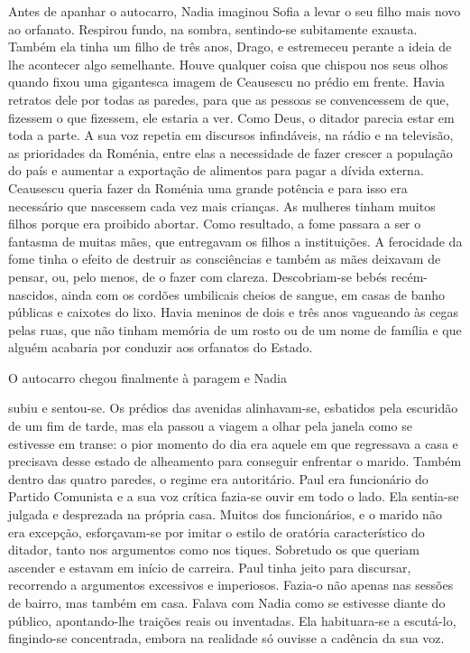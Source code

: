 Antes de apanhar o autocarro, Nadia imaginou Sofia a levar o seu filho
mais novo ao orfanato. Respirou fundo, na sombra, sentindo-se
subitamente exausta. Também ela tinha um filho de três anos, Drago, e
estremeceu perante a ideia de lhe acontecer algo semelhante. Houve
qualquer coisa que chispou nos seus olhos quando fixou uma gigantesca
imagem de Ceausescu no prédio em frente. Havia retratos dele por todas
as paredes, para que as pessoas se convencessem de que, fizessem o que
fizessem, ele estaria
a ver. Como Deus, o ditador parecia estar em toda a parte. A sua voz
repetia em discursos infindáveis, na rádio e na televisão, as
prioridades da Roménia, entre elas a necessidade de fazer crescer a
população do país e aumentar a exportação de alimentos para pagar a
dívida externa. Ceausescu queria fazer da Roménia uma grande potência e
para isso era necessário que nascessem cada vez mais crianças. As
mulheres tinham muitos filhos porque era proibido abortar. Como
resultado, a fome passara a ser o fantasma de muitas mães, que
entregavam os filhos a instituições. A ferocidade da fome tinha o
efeito de destruir as consciências e também as mães deixavam de pensar,
ou, pelo menos, de o fazer com clareza. Descobriam-se bebés
recém-nascidos, ainda com os cordões umbilicais cheios de sangue, em
casas de banho públicas e caixotes do lixo. Havia meninos de dois e três
anos vagueando às cegas pelas ruas, que não tinham memória de um rosto
ou de um nome de família e que alguém acabaria por conduzir aos
orfanatos do Estado.

O autocarro chegou finalmente à paragem e Nadia

subiu e sentou-se. Os prédios das avenidas alinhavam-se, esbatidos pela
escuridão de um fim de tarde, mas ela passou a viagem a olhar pela
janela como se estivesse em transe: o pior momento do dia era aquele em
que regressava a casa e precisava desse estado de alheamento para
conseguir enfrentar o marido. Também dentro das quatro paredes, o regime
era autoritário. Paul era funcionário do Partido Comunista e a sua voz
crítica fazia-se ouvir em todo o lado. Ela sentia-se julgada e
desprezada na própria casa. Muitos dos funcionários, e o marido não era
excepção,
esforçavam-se por imitar o estilo de oratória característico do ditador,
tanto nos argumentos como nos tiques. Sobretudo os que queriam
ascender e estavam em início de carreira. Paul tinha jeito para
discursar, recorrendo a argumentos excessivos e imperiosos. Fazia-o não
apenas nas sessões de bairro, mas também em casa. Falava com Nadia como
se estivesse diante do público, apontando-lhe traições reais ou
inventadas. Ela habituara-se a escutá-lo, fingindo-se concentrada,
embora na realidade só ouvisse a cadência da sua voz.

